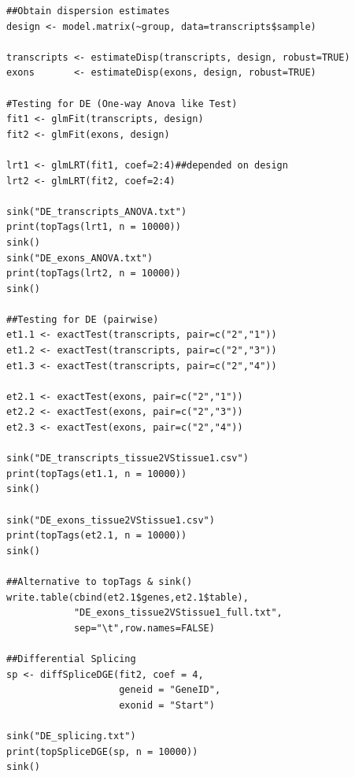 \begin{verbatim}
##Obtain dispersion estimates
design <- model.matrix(~group, data=transcripts$sample)

transcripts <- estimateDisp(transcripts, design, robust=TRUE)
exons       <- estimateDisp(exons, design, robust=TRUE)

#Testing for DE (One-way Anova like Test)
fit1 <- glmFit(transcripts, design)
fit2 <- glmFit(exons, design)

lrt1 <- glmLRT(fit1, coef=2:4)##depended on design
lrt2 <- glmLRT(fit2, coef=2:4)

sink("DE_transcripts_ANOVA.txt")
print(topTags(lrt1, n = 10000))
sink()
sink("DE_exons_ANOVA.txt")
print(topTags(lrt2, n = 10000))
sink()

##Testing for DE (pairwise)
et1.1 <- exactTest(transcripts, pair=c("2","1"))
et1.2 <- exactTest(transcripts, pair=c("2","3"))
et1.3 <- exactTest(transcripts, pair=c("2","4"))

et2.1 <- exactTest(exons, pair=c("2","1"))
et2.2 <- exactTest(exons, pair=c("2","3"))
et2.3 <- exactTest(exons, pair=c("2","4"))

sink("DE_transcripts_tissue2VStissue1.csv")
print(topTags(et1.1, n = 10000))
sink()

sink("DE_exons_tissue2VStissue1.csv")
print(topTags(et2.1, n = 10000))
sink()

##Alternative to topTags & sink()
write.table(cbind(et2.1$genes,et2.1$table),
            "DE_exons_tissue2VStissue1_full.txt",
            sep="\t",row.names=FALSE)

##Differential Splicing
sp <- diffSpliceDGE(fit2, coef = 4,
                    geneid = "GeneID",
                    exonid = "Start")

sink("DE_splicing.txt")
print(topSpliceDGE(sp, n = 10000))
sink()
\end{verbatim}

